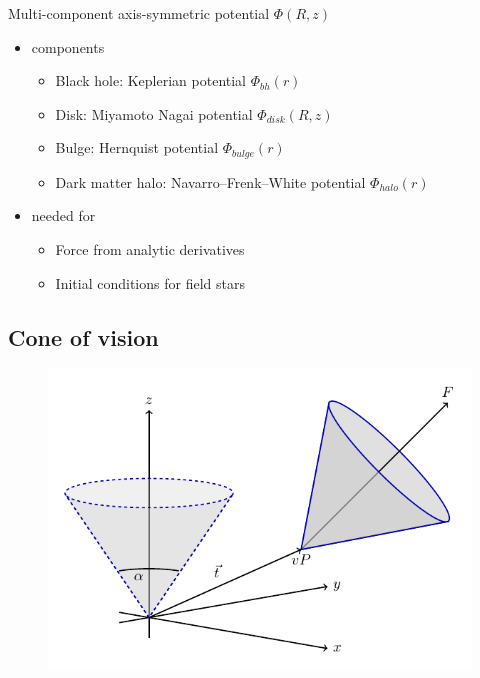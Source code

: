 \documentclass{beamer}
\begin{document}
\begin{frame}

Multi-component axis-symmetric potential \(\Phi \left ( R,z \right )\)

\begin{itemize}
\item components
	\begin{itemize}
	\item Black hole: Keplerian potential \(\Phi_{bh} \left ( r \right )\)
	\item Disk: Miyamoto Nagai potential \(\Phi_{disk} \left ( R,z \right )\)
	\item Bulge: Hernquist potential \(\Phi_{bulge} \left ( r\right )\)
	\item Dark matter halo: Navarro–Frenk–White potential \(\Phi_{halo} \left ( r \right )\)
	\end{itemize}
\item needed for
	\begin{itemize}
	\item Force from analytic derivatives
	\item Initial conditions for field stars
	\end{itemize}
\end{itemize}

\end{frame}

\subsection{Cone of vision}

\begin{frame}
\begin{figure}
\centering
\includegraphics[width=0.9\linewidth]{Images/cone.pdf}
\end{figure}
\end{frame}
\end{document}
